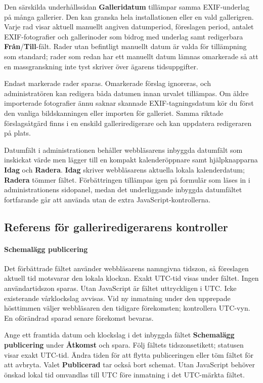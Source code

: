 \documentclass[11pt,a4paper]{article}
\newcommand{\ui}[1]{\textbf{#1}}
\begin{document}
Den särskilda underhållssidan \ui{Galleridatum} tillämpar samma EXIF-underlag på
många gallerier. Den kan granska hela installationen eller en vald gallerigren.
Varje rad visar aktuell manuellt angiven datumperiod, föreslagen period, antalet
EXIF-fotografier och gallerinoder som bidrog med underlag samt redigerbara
\ui{Från}/\ui{Till}-fält. Rader utan befintligt manuellt datum är valda för
tillämpning som standard; rader som redan har ett manuellt datum lämnas
omarkerade så att en massgranskning inte tyst skriver över ägarens
tidsuppgifter.

Endast markerade rader sparas. Omarkerade förslag ignoreras, och administratören
kan redigera båda datumen innan urvalet tillämpas. Om äldre importerade
fotografier ännu saknar skannade EXIF-tagningsdatum kör du först den vanliga
bildskanningen eller importen för galleriet. Samma riktade förslagsåtgärd finns
i en enskild galleriredigerare och kan uppdatera redigeraren på plats.

Datumfält i administrationen behåller webbläsarens inbyggda datumfält som
inskickat värde men lägger till en kompakt kalenderöppnare samt hjälpknapparna
\ui{Idag} och \ui{Radera}. \ui{Idag} skriver webbläsarens aktuella lokala
kalenderdatum; \ui{Radera} tömmer fältet. Förbättringen tillämpas igen på
formulär som läses in i administrationens sidopanel, medan det underliggande
inbyggda datumfältet fortfarande går att använda utan de extra
JavaScript-kontrollerna.

\subsection{Referens för galleriredigerarens kontroller}
\paragraph{Schemalägg publicering}
Det förbättrade fältet använder webbläsarens namngivna tidszon, så föreslagen
aktuell tid motsvarar den lokala klockan. Exakt UTC-tid visas under fältet.
Ingen användartidszon sparas. Utan JavaScript är fältet uttryckligen i UTC.
Icke existerande vårklockslag avvisas. Vid ny inmatning under den upprepade
hösttimmen väljer webbläsaren den tidigare förekomsten; kontrollera UTC-vyn.
En oförändrad sparad senare förekomst bevaras.

Ange ett framtida datum och klockslag i det inbyggda fältet
\ui{Schemalägg publicering} under \ui{Åtkomst} och spara.
Följ fältets tidszonsetikett; statusen visar exakt UTC-tid.
Ändra tiden för att flytta publiceringen eller töm fältet för att avbryta.
Valet \ui{Publicerad} tar också bort schemat. Utan JavaScript behöver önskad
lokal tid omvandlas till UTC före inmatning i det UTC-märkta fältet.
\end{document}
